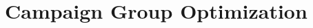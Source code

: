 \documentclass[../main.tex]{subfiles}
\begin{document}
	\chapter{Campaign Group Optimization}
	
	
	
	
\end{document}
